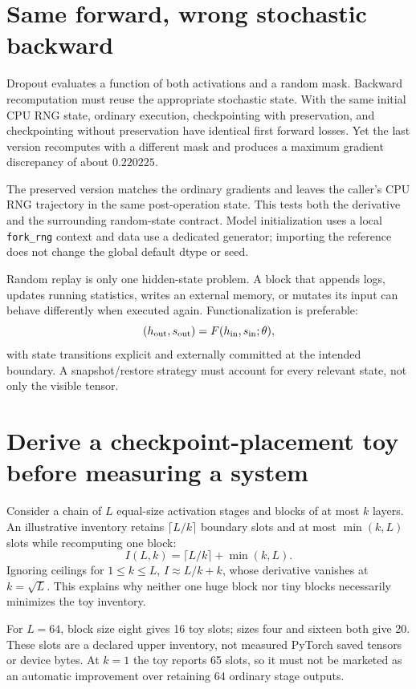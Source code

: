 \section{Same forward, wrong stochastic backward}
Dropout evaluates a function of both activations and a random mask. Backward
recomputation must reuse the appropriate stochastic state. With the same initial
CPU RNG state, ordinary execution, checkpointing with preservation, and
checkpointing without preservation have identical first forward losses.
Yet the last version recomputes with a different mask and produces a maximum
gradient discrepancy of about $0.220225$.

The preserved version matches the ordinary gradients and leaves the caller's CPU
RNG trajectory in the same post-operation state. This tests both the derivative
and the surrounding random-state contract. Model initialization uses a local
\texttt{fork\_rng} context and data use a dedicated generator; importing the
reference does not change the global default dtype or seed.

Random replay is only one hidden-state problem. A block that appends logs, updates
running statistics, writes an external memory, or mutates its input can behave
differently when executed again. Functionalization is preferable:
\[
(h_{\rm out},s_{\rm out})=F(h_{\rm in},s_{\rm in};\theta),
\]
with state transitions explicit and externally committed at the intended boundary.
A snapshot/restore strategy must account for every relevant state, not only the
visible tensor.

\section{Derive a checkpoint-placement toy before measuring a system}
Consider a chain of $L$ equal-size activation stages and blocks of at most $k$
layers. An illustrative inventory retains $\lceil L/k\rceil$ boundary slots and
at most $\min(k,L)$ slots while recomputing one block:
\[
I(L,k)=\lceil L/k\rceil+\min(k,L).
\]
Ignoring ceilings for $1\le k\le L$, $I\approx L/k+k$, whose derivative vanishes
at $k=\sqrt L$. This explains why neither one huge block nor tiny blocks necessarily
minimizes the toy inventory.

\begin{center}\end{center}
For $L=64$, block size eight gives 16 toy slots; sizes four and sixteen both give
20. These slots are a declared upper inventory, not measured PyTorch saved tensors
or device bytes. At $k=1$ the toy reports 65 slots, so it must not be marketed as
an automatic improvement over retaining 64 ordinary stage outputs.

